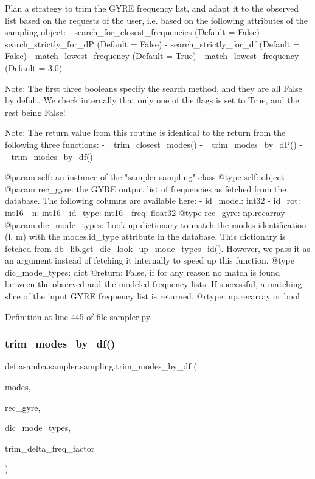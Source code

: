 \begin{DoxyVerb}Plan a strategy to trim the GYRE frequency list, and adapt it to the observed list based on the 
requests of the user, i.e. based on the following attributes of the sampling object: 
- search_for_closest_frequencies (Default = False)
- search_strictly_for_dP (Default = False)
- search_strictly_for_df (Default = False)
- match_lowest_frequency (Default = True)
- match_lowest_frequency (Default = 3.0)

Note: The first three booleans specify the search method, and they are all False by defult. We check
internally that only one of the flags is set to True, and the rest being False!

Note: The return value from this routine is identical to the return from the following three functions:
- _trim_closest_modes()
- _trim_modes_by_dP()
- _trim_modes_by_df()

@param self: an instance of the "sampler.sampling" class
@type self: object
@param rec_gyre: the GYRE output list of frequencies as fetched from the database. The following
     columns are available here:
     - id_model: int32
     - id_rot: int16
     - n: int16
     - id_type: int16
     - freq: float32
@type rec_gyre: np.recarray
@param dic_mode_types: Look up dictionary to match the modes identification (l, m) with the modes.id_type
  attribute in the database. This dictionary is fetched from db_lib.get_dic_look_up_mode_types_id(). 
  However, we pass it as an argument instead of fetching it internally to speed up this function.
@type dic_mode_types: dict
@return: False, if for any reason no match is found between the observed and the modeled frequency lists.
     If successful, a matching slice of the input GYRE frequency list is returned.
@rtype: np.recarray or bool
\end{DoxyVerb}
 

Definition at line 445 of file sampler.\+py.

\mbox{\label{classasamba_1_1sampler_1_1sampling_a0fe5ca163f5e1c07a017783818535579}} 
\subsubsection{\texorpdfstring{trim\+\_\+modes\+\_\+by\+\_\+df()}{trim\_modes\_by\_df()}}
{\footnotesize\ttfamily def asamba.\+sampler.\+sampling.\+trim\+\_\+modes\+\_\+by\+\_\+df (\begin{DoxyParamCaption}\item[{}]{modes,  }\item[{}]{rec\+\_\+gyre,  }\item[{}]{dic\+\_\+mode\+\_\+types,  }\item[{}]{trim\+\_\+delta\+\_\+freq\+\_\+factor }\end{DoxyParamCaption})}


